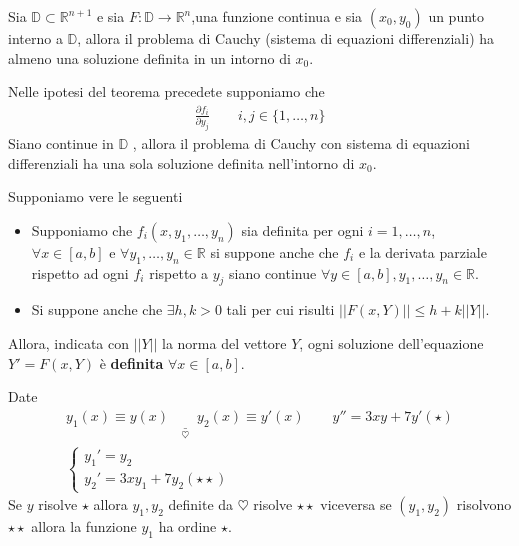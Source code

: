 \documentclass[a4paper, oneside]{book}
\begin{document}
\begin{theorem}[Teorema 1]
    Sia $\mathbb{D} \subset \mathbb{R}^{n + 1}$ e sia $F : \mathbb{D} \to \mathbb{R}^{n}$,una
    funzione continua e sia $(x_0, y_0)$ un punto interno a $\mathbb{D}$, allora 
    il problema di Cauchy (sistema di equazioni differenziali) ha almeno una soluzione definita in un intorno  
    di $x_0$.
\end{theorem}

\begin{theorem}[Teorema 2]
    Nelle ipotesi del teorema precedete supponiamo che
    \begin{gather*}
        \frac{\partial f_i}{\partial y_j} \qquad i, j \in \{1, \dots, n\} 
    \end{gather*}
    Siano continue in $\mathbb{D}$ , allora il problema di Cauchy con sistema di equazioni
    differenziali ha una sola soluzione definita nell'intorno di $x_0$.
\end{theorem}

\begin{theorem}[Teorema 3]
    Supponiamo vere le seguenti
    \begin{itemize}
        \item Supponiamo che $f_i(x, y_1, \dots, y_n)$ sia definita per ogni $i = 1,\dots, n$,
    $\forall x \in [a, b]$ e $\forall y_1, \dots, y_n \in \mathbb{R}$ si suppone anche che
    $f_i$ e la derivata parziale rispetto ad ogni $f_i$ rispetto a $y_j$ siano continue
    $\forall y \in [a, b], y_1, \dots, y_n \in \mathbb{R}$.
    \item Si suppone anche che $\exists h, k  >0$ tali per cui
    risulti $||F(x, Y)|| \leq h + k ||Y||$. 
    \end{itemize}
    Allora, indicata con $||Y||$ la norma del vettore $Y$, ogni soluzione dell'equazione $Y' = F(x , Y)$ 
    è \textbf{definita} $\forall x \in [a, b]$.
\end{theorem}
\begin{example}
    Date
    \begin{gather*}
        \underset{\heartsuit}{\underline{y_1(x) \equiv y(x) \qquad y_2(x) \equiv y'(x)}} \qquad y'' = 3xy + 7y' (\star) \\
        \left\{\begin{array}{l}
            y_1' = y_2 \\
            y_2' = 3xy_1 + 7y_2 (\star \star)
        \end{array}\right. 
    \end{gather*}
    Se $y$ risolve $\star$ allora $y_1, y_2$ definite da $\heartsuit$ risolve $\star \star$ viceversa
    se $(y_1, y_2)$ risolvono $\star \star$ allora la funzione $y_1$ ha ordine $\star$.  
\end{example}
\end{document}
